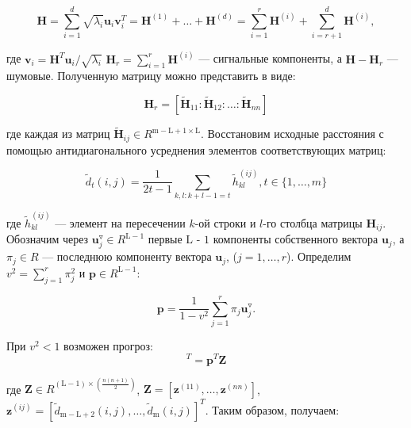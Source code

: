 \documentclass{article}
\begin{document}
\begin{equation}
    \mathbf{H} = \sum\limits_{i = 1}^d\sqrt{\lambda_i}\mathbf{u}_i\mathbf{v}_i^T = \mathbf{H}^{(1)} + \ldots + \mathbf{H}^{(d)} = \sum\limits_{i = 1}^r \mathbf{H}^{(i)} + \sum\limits_{i = r + 1}^d \mathbf{H}^{(i)},
\end{equation}

 где $\mathbf{v}_i = \mathbf{H}^T\mathbf{u}_i/\sqrt{\lambda_i}$ $\mathbf{H}_r = \sum\limits_{i = 1}^{r} \mathbf{H}^{(i)}$ --- сигнальные компоненты, а $\mathbf{H} - \mathbf{H}_r$ --- 
шумовые. Полученную матрицу можно представить в виде:

\begin{equation}
    \mathbf{H}_r = [ \widetilde{\mathbf{H}}_{11} : \widetilde{\mathbf{H}}_{12} : \ldots : \widetilde{\mathbf{H}}_{nn}]
\end{equation}

где каждая из матриц $\widetilde{\mathbf{H}}_{ij} \in R^{\text{m} - \text{L} + 1 \times \text{L}}$. Восстановим исходные расстояния с помощью антидиагонального усреднения элементов соответствующих матриц:

\begin{equation}
    \widetilde{d}_t(i, j) = \dfrac{1}{2t - 1} \sum\limits_{k, l: k + l - 1 = t} \widetilde{h}^{(ij)}_{kl}, t \in \{1, \ldots, m\}
\end{equation}

где $\widetilde{h}^{(ij)}_{kl}$ --- элемент на пересечении $k$-ой строки и $l$-го столбца матрицы $\mathbf{H}_{ij}$. Обозначим через $\mathbf{u}^{\triangledown}_j \in R^{\text{L} - 1}$ первые $\text{L - 1}$ компоненты собственного вектора $\mathbf{u}_j$, а $\pi_j \in R$ --- последнюю компоненту вектора $\mathbf{u}_j$, ($j = 1, \ldots, r$). Определим $v^2 = \sum\limits_{j = 1}^r \pi_{j}^2$ и $\mathbf{p} \in R^{\text{L} - 1}$:

\begin{equation}
    \mathbf{p} = \dfrac{1}{1 - v^2} \sum\limits_{j = 1}^r\pi_j\mathbf{u}_j^{\triangledown}.
\end{equation}

При $v^2 < 1$ возможен прогроз:
\begin{equation}
    [\widetilde{d}_{\text{m} + 1}(1, 1), \widetilde{d}_{\text{m} + 1}(1, 2), \ldots, \widetilde{d}_{\text{m} + 1}(n, n)]^T = \mathbf{p}^T\mathbf{Z}
\end{equation}

где $\mathbf{Z} \in R^{(\text{L} - 1) \times (\frac{n(n + 1)}{2})}$, $\mathbf{Z} = [\mathbf{z}^{(11)}, \ldots, \mathbf{z}^{(nn)}]$, $\mathbf{z}^{(ij)} = [\widetilde{d}_{\text{m} - \text{L} + 2}(i, j), \ldots, \widetilde{d}_{\text{m}}(i, j)]^T$. Таким образом, получаем:
\end{document}
